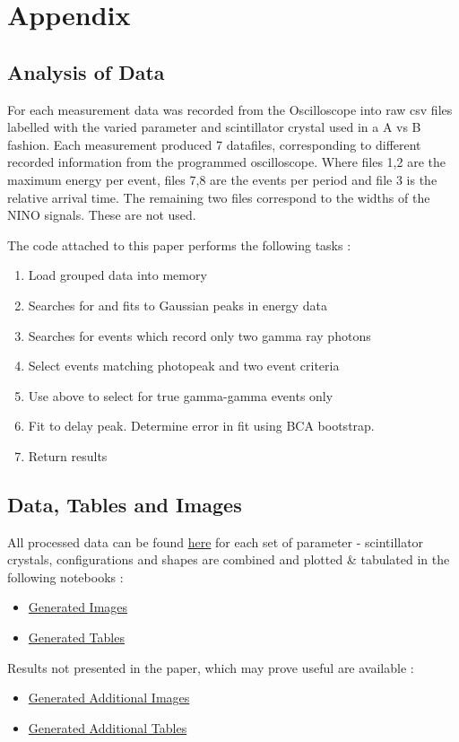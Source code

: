 \section*{Appendix}
\subsection{Analysis of Data}
For each measurement data was recorded from the Oscilloscope into raw csv files labelled with the varied parameter and scintillator crystal used in a A vs B fashion. Each measurement produced 7 datafiles, corresponding to different recorded information from the programmed oscilloscope. Where files 1,2 are the maximum energy per event, files 7,8 are the events per period and file 3 is the relative arrival time. The remaining two files correspond to the widths of the NINO signals. These are not used.

The code attached to this paper performs the following tasks : 

\begin{enumerate}
\item Load grouped data into memory
\item Searches for and fits to Gaussian peaks in energy data
\item Searches for events which record only two gamma ray photons
\item Select events matching photopeak and two event criteria
\item Use above to select for true gamma-gamma events only
\item Fit to delay peak. Determine error in fit using BCA bootstrap.
\item Return results
\end{enumerate}

\subsection{Data, Tables and Images}
All processed data can be found \href{https://github.com/marksbrown/doipaper/tree/master/processeddata}{here} for each set of parameter - scintillator crystals, configurations and shapes are combined and plotted \& tabulated in the following notebooks :
\begin{itemize}
\item \href{http://nbviewer.ipython.org/github/marksbrown/doipaper/blob/master/notebooks/Generate\%20Images.ipynb}{Generated Images}
\item \href{http://nbviewer.ipython.org/github/marksbrown/doipaper/blob/master/notebooks/Generate\%20Tables.ipynb}{Generated Tables}
\end{itemize}
Results not presented in the paper, which may prove useful are available :
\begin{itemize}
\item \href{http://nbviewer.ipython.org/github/marksbrown/doipaper/blob/master/notebooks/Generate\%20Additional\%20Images.ipynb}{Generated Additional Images}
\item \href{http://nbviewer.ipython.org/github/marksbrown/doipaper/blob/master/notebooks/Generate\%20Additional\%20Tables.ipynb}{Generated Additional Tables}
\end{itemize}
